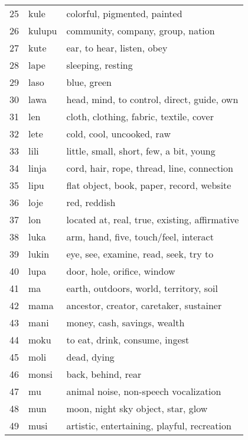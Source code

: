 \documentclass[11pt]{article}
\begin{document}
{\begin{multicols}{2}[]
\begin{center}
\begin{tabularx}{\linewidth}{rlX}
25 & kule & colorful, pigmented, painted\\[0pt]
26 & kulupu & community, company, group, nation\\[0pt]
27 & kute & ear, to hear, listen, obey\\[0pt]
28 & lape & sleeping, resting\\[0pt]
29 & laso & blue, green\\[0pt]
30 & lawa & head, mind, to control, direct, guide, own\\[0pt]
31 & len & cloth, clothing, fabric, textile, cover\\[0pt]
32 & lete & cold, cool, uncooked, raw\\[0pt]
33 & lili & little, small, short, few, a bit, young\\[0pt]
34 & linja & cord, hair, rope, thread, line, connection\\[0pt]
35 & lipu & flat object, book, paper, record, website\\[0pt]
36 & loje & red, reddish\\[0pt]
37 & lon & located at, real, true, existing, affirmative\\[0pt]
38 & luka & arm, hand, five, touch/feel, interact\\[0pt]
39 & lukin & eye, see, examine, read, seek, try to\\[0pt]
40 & lupa & door, hole, orifice, window\\[0pt]
41 & ma & earth, outdoors, world, territory, soil\\[0pt]
42 & mama & ancestor, creator, caretaker, sustainer\\[0pt]
43 & mani & money, cash, savings, wealth\\[0pt]
44 & moku & to eat, drink, consume, ingest\\[0pt]
45 & moli & dead, dying\\[0pt]
46 & monsi & back, behind, rear\\[0pt]
47 & mu & animal noise, non-speech vocalization\\[0pt]
48 & mun & moon, night sky object, star, glow\\[0pt]
49 & musi & artistic, entertaining, playful, recreation\\[0pt]
\end{tabularx}
\end{center}



\end{multicols}}
\end{document}
